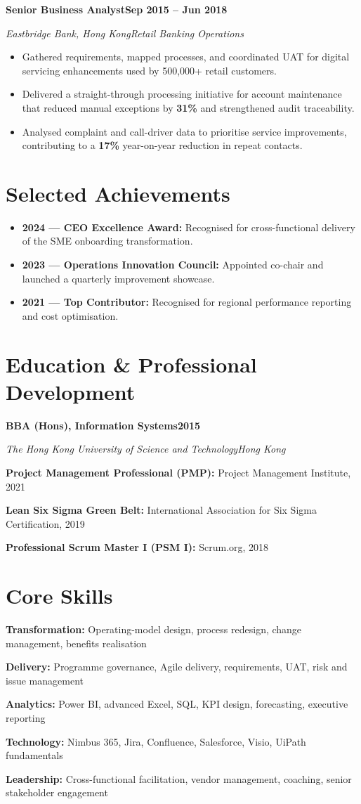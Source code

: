 \documentclass[10pt,a4paper]{article}
\newcommand{\role}[4]{%
  \textbf{\color{ink}#1}\hfill\textbf{\color{navy}#2}\par
  \textit{\color{muted}#3}\hfill\textit{\color{muted}#4}\par\vspace{-0.15em}
}
\newcommand{\education}[4]{%
  \textbf{#1}\hfill\textbf{\color{navy}#2}\par
  \textit{\color{muted}#3}\hfill\textit{\color{muted}#4}\par
}
\newcommand{\skillline}[2]{%
  \textbf{\color{navy}#1:} #2\par\vspace{0.18em}
}
\begin{document}
\vspace{0.28em}
\newpage
\role{Senior Business Analyst}{Sep 2015 -- Jun 2018}
     {Eastbridge Bank, Hong Kong}{Retail Banking Operations}
\begin{itemize}
  \item Gathered requirements, mapped processes, and coordinated UAT for digital servicing enhancements used by 500,000+ retail customers.
  \item Delivered a straight-through processing initiative for account maintenance that reduced manual exceptions by \textbf{31\%} and strengthened audit traceability.
  \item Analysed complaint and call-driver data to prioritise service improvements, contributing to a \textbf{17\%} year-on-year reduction in repeat contacts.
\end{itemize}

\section*{Selected Achievements}
\begin{itemize}
  \item \textbf{2024 --- CEO Excellence Award:} Recognised for cross-functional delivery of the SME onboarding transformation.
  \item \textbf{2023 --- Operations Innovation Council:} Appointed co-chair and launched a quarterly improvement showcase.
  \item \textbf{2021 --- Top Contributor:} Recognised for regional performance reporting and cost optimisation.
\end{itemize}

\section*{Education \& Professional Development}
\education{BBA (Hons), Information Systems}{2015}
          {The Hong Kong University of Science and Technology}{Hong Kong}
\vspace{0.25em}
\skillline{Project Management Professional (PMP)}{Project Management Institute, 2021}
\skillline{Lean Six Sigma Green Belt}{International Association for Six Sigma Certification, 2019}
\skillline{Professional Scrum Master I (PSM I)}{Scrum.org, 2018}

\section*{Core Skills}
\skillline{Transformation}{Operating-model design, process redesign, change management, benefits realisation}
\skillline{Delivery}{Programme governance, Agile delivery, requirements, UAT, risk and issue management}
\skillline{Analytics}{Power BI, advanced Excel, SQL, KPI design, forecasting, executive reporting}
\skillline{Technology}{Nimbus 365, Jira, Confluence, Salesforce, Visio, UiPath fundamentals}
\skillline{Leadership}{Cross-functional facilitation, vendor management, coaching, senior stakeholder engagement}
\end{document}
